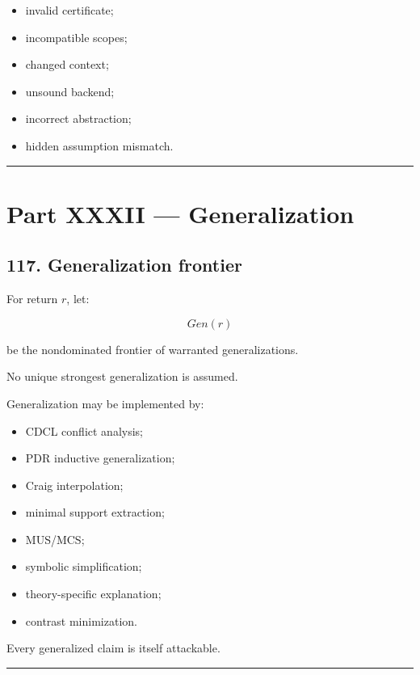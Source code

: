 \documentclass[
]{article}
\providecommand{\tightlist}{%
  \setlength{\itemsep}{0pt}\setlength{\parskip}{0pt}}
\begin{document}
\begin{itemize}
\tightlist
\item
  invalid certificate;
\item
  incompatible scopes;
\item
  changed context;
\item
  unsound backend;
\item
  incorrect abstraction;
\item
  hidden assumption mismatch.
\end{itemize}

\begin{center}\rule{0.5\linewidth}{0.5pt}\end{center}

\section{Part XXXII --- Generalization}\label{part-xxxii-generalization}

\subsection{117. Generalization frontier}\label{generalization-frontier}

For return \(r\), let:

\[
\boxed{
Gen(r)
}
\]

be the nondominated frontier of warranted generalizations.

No unique strongest generalization is assumed.

Generalization may be implemented by:

\begin{itemize}
\tightlist
\item
  CDCL conflict analysis;
\item
  PDR inductive generalization;
\item
  Craig interpolation;
\item
  minimal support extraction;
\item
  MUS/MCS;
\item
  symbolic simplification;
\item
  theory-specific explanation;
\item
  contrast minimization.
\end{itemize}

Every generalized claim is itself attackable.

\begin{center}\rule{0.5\linewidth}{0.5pt}\end{center}
\end{document}
